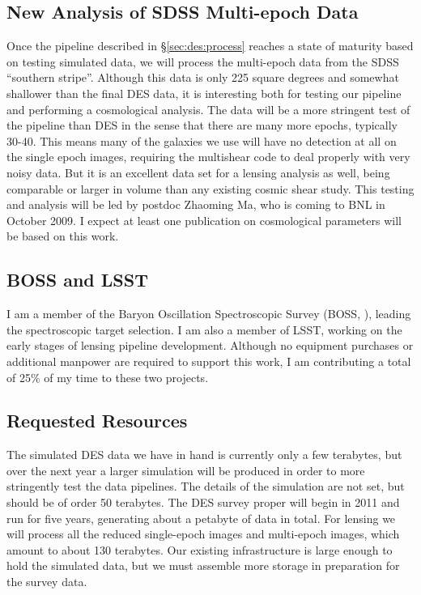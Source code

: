 \documentclass[12pt]{article}
\begin{document}
\subsection{New Analysis of SDSS Multi-epoch Data} \label{sec:sdssnew}

Once the pipeline described in \S \ref{sec:des:process} reaches a state of
maturity based on testing simulated data, we will process the multi-epoch data
from the SDSS ``southern stripe''.  Although this data is only 225 square
degrees and somewhat shallower than the final DES data, it is interesting both
for testing our pipeline and performing a cosmological analysis.  The data will
be a more stringent test of the pipeline than DES in the sense that there are
many more epochs, typically 30-40.  This means many of the galaxies we use will
have no detection at all on the single epoch images, requiring the multishear
code to deal properly with very noisy data.  But it is an excellent data set
for a lensing analysis as well, being comparable or larger in volume than any
existing cosmic shear study.  This testing and analysis will be led by postdoc
Zhaoming Ma, who is coming to BNL in October 2009.  I expect at least one
publication on cosmological parameters will be based on this work.

\subsection{BOSS and LSST}

I am a member of the Baryon Oscillation Spectroscopic Survey (BOSS,
\cite{BossWhitePaper}), leading the spectroscopic target selection.  I am also
a member of LSST, working on the early stages of lensing pipeline development.
Although no equipment purchases or additional manpower are required to support
this work, I am contributing a total of 25\% of my time to these two projects.

\subsection{Requested Resources}

The simulated DES data we have in hand is currently only a few terabytes, but
over the next year a larger simulation will be produced in order to more
stringently test the data pipelines.  The details of the simulation are not
set, but should be of order 50 terabytes.  The DES survey proper will begin in
2011 and run for five years, generating about a petabyte of data in total.  For
lensing we will process all the reduced single-epoch images and multi-epoch
images, which amount to about 130 terabytes.  Our existing infrastructure is
large enough to hold the simulated data, but we must assemble more storage in
preparation for the survey data.
\end{document}
